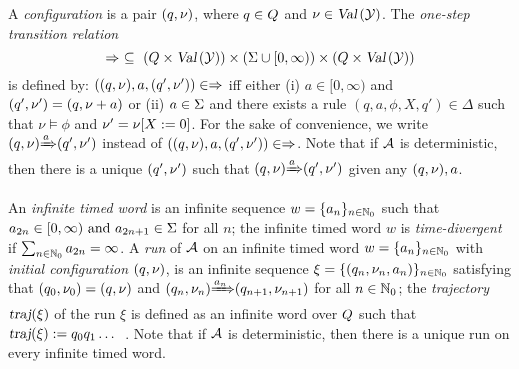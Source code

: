 \smallskip{}
A \emph{configuration} is a pair $(q,\nu)$, where $q\in Q$ and $\nu\in\mbox{\sl Val}\left(\mathcal{Y}\right)$.
The \emph{one-step transition relation}
\[
\Rightarrow~\subseteq~ (Q \times \mbox{\sl Val}\left(\mathcal{Y}\right)) \times (\Sigma\cup [0,\infty)) \times (Q \times \mbox{\sl Val}\left(\mathcal{Y}\right))
\]
is defined by: $((q,\nu),a,(q',\nu'))\in\Rightarrow$ iff
either (i) $a\in [0,\infty)$ and $(q',\nu')=(q,\nu+a)$
or (ii) $a\in\Sigma$ and there exists a rule $(q,a,\phi,X,q')\in\Delta$
such that $\nu\models\phi$ and $\nu'={\nu}{\left[X:=0\right]}$.
For the sake of convenience, we write ${(q,\nu)}{\xRightarrow{a}}{(q',\nu')}$
instead of $((q,\nu),a,(q',\nu'))\in\Rightarrow$.
Note that if $\mathcal{A}$ is deterministic, then there is a unique $(q',\nu')$ such that
${(q,\nu)}{\xRightarrow{a}}{(q',\nu')}$ given any $(q,\nu), a$.



\smallskip
{}
An \emph{infinite timed word} is an infinite sequence $w=\{a_n\}_{n\in\mathbb{N}_0}$ such that
$
    a_{2n}      \in [0,\infty)
    \mbox{ and }
    a_{2n+1}    \in \Sigma
$
for all $n$;
the infinite timed word $w$ is \emph{time-divergent} if $\sum_{n\in\mathbb{N}_0}a_{2n}=\infty$.
A \emph{run} of $\mathcal{A}$ on an infinite timed word $w=\{a_n\}_{n\in\mathbb{N}_0}$
with \emph{initial configuration} $(q,\nu)$,
is an infinite
sequence $\xi=\{\left(q_n,\nu_n,a_n\right)\}_{n\in\mathbb{N}_0}$
satisfying that $(q_0,\nu_0)=(q,\nu)$ and ${(q_n,\nu_n)}{\xRightarrow{a_n}}{(q_{n+1},\nu_{n+1})}$
for all $n\in\mathbb{N}_0$;
the \emph{trajectory}
$\mbox{\sl traj} (  \xi  )$
of the run
$\xi$
is defined as an infinite word over $Q$ such that
$\mbox{\sl traj} (  \xi  ) := q_0 q_1 \dots$~.
Note that if $\mathcal{A}$ is deterministic, then there is a unique run on every infinite timed word.


